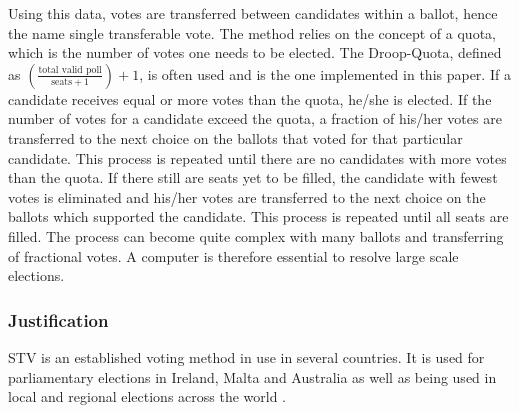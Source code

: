 \documentclass[12pt]{article}
\begin{document}
Using this data, votes are transferred between candidates within a ballot, hence the name single transferable vote. The method relies on the concept of a quota, which is the number of votes one needs to be elected. The Droop-Quota, defined as $(\frac{\text{total valid poll}}{\text{seats} + 1})+1$, is often used and is the one implemented in this paper. If a candidate receives equal or more votes than the quota, he/she is elected. If the number of votes for a candidate exceed the quota, a fraction of his/her votes are transferred to the next choice on the ballots that voted for that particular candidate. This process is repeated until there are no candidates with more votes than the quota. If there still are seats yet to be filled, the candidate with fewest votes is eliminated and his/her votes are transferred to the next choice on the ballots which supported the candidate. This process is repeated until all seats are filled. The process can become quite complex with many ballots and transferring of fractional votes. A computer is therefore essential to resolve large scale elections. \autocite{king200}
\subsubsection{Justification}
STV is an established voting method in use in several countries. It is used for parliamentary elections in Ireland, Malta and Australia as well as being used in local and regional elections across the world \autocite{tideman1995single}.
\end{document}
